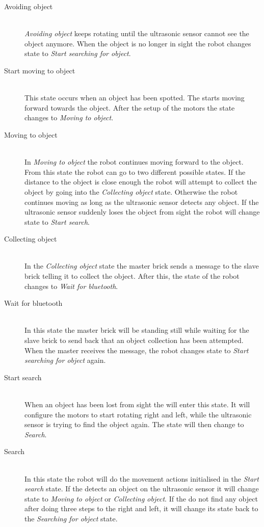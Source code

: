 \begin{description}
\item[Avoiding object] \hfill \\
\emph{Avoiding object} keeps rotating until the ultrasonic sensor cannot see the object anymore. When the object is no longer in sight the robot changes state to \emph{Start searching for object}.

\item[Start moving to object] \hfill \\
This state occurs when an object has been spotted. The \projname{} starts moving forward towards the object. After the setup of the motors the state changes to \emph{Moving to object}.

\item[Moving to object] \hfill \\
In \emph{Moving to object} the robot continues moving forward to the object. From this state the robot can go to two different possible states. If the distance to the object is close enough the robot will attempt to collect the object by going into the \emph{Collecting object} state. Otherwise the robot continues moving as long as the ultrasonic sensor detects any object. If the ultrasonic sensor suddenly loses the object from sight the robot will change state to \emph{Start search}.

\item[Collecting object] \hfill \\
In the \emph{Collecting object} state the master brick sends a message to the slave brick telling it to collect the object. After this, the state of the robot changes to \emph{Wait for bluetooth}.

\item[Wait for bluetooth] \hfill \\
In this state the master brick will be standing still while waiting for the slave brick to send back that an object collection has been attempted. When the master receives the message, the robot changes state to \emph{Start searching for object} again. 

\item[Start search] \hfill \\
When an object has been lost from sight the \projname{} will enter this state. It will configure the motors to start rotating right and left, while the ultrasonic sensor is trying to find the object again. The state will then change to \emph{Search}.

\item[Search] \hfill \\
In this state the robot will do the movement actions initialised in the \emph{Start search} state. If the \projname{} detects an object on the ultrasonic sensor it will change state to \emph{Moving to object} or \emph{Collecting object}. If the \projname{} do not find any object after doing three steps to the right and left, it will change its state back to the \emph{Searching for object} state. 

\end{description}